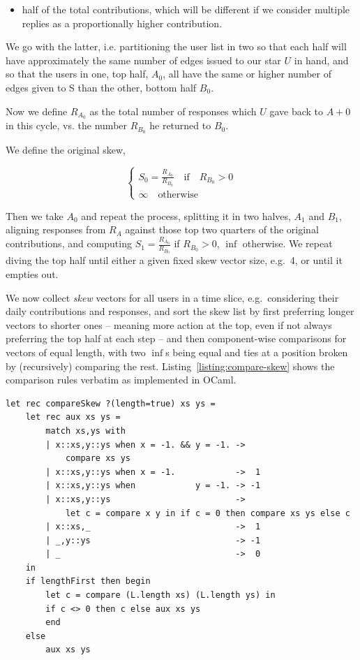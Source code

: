 \documentclass[10pt,oneside]{memoir}
\begin{document}
\begin{Spacing}{2}
\begin{itemize}
\item half of the total contributions, which will be different if we consider multiple replies as a proportionally higher contribution.
\end{itemize}


We go with the latter, i.e. partitioning the user list in two so that each half will have approximately the same number of edges issued to our star $U$ in hand, and so that the users in one, top half, $A_0$, all have the same or higher number of edges given to S than the other, bottom half $B_0$.

Now we define $R_{A_0}$ as the total number of responses  which $U$ gave back to $A+0$ in this cycle, vs. the number $R_{B_0}$ he returned to $B_0$.

We define the original skew,

\[
\left\lbrace
\begin{array}{l}
    S_0 = \frac{R_{A_0}}{R_{B_0}} \quad\mbox{if}\quad R_{B_0} > 0 \\
    \infty \quad\mbox{otherwise} 
\end{array}
\right.
\]

Then we take $A_0$ and repeat the process, splitting it in two halves, $A_1$ and $B_1$, aligning responses from $R_A$ against those top two quarters of the original contributions, and computing $S_1 = \frac{R_{A_0}}{R_{B_0}}$ if $R_{B_0} > 0$, $\inf$ otherwise.
We repeat diving the top half until either a given fixed skew vector size, e.g.\ 4, or until it empties out.


We now collect {\itshape skew} vectors for all users in a time slice, e.g.\ considering their daily contributions and responses, and sort the skew list by first preferring longer vectors to shorter ones -- meaning more action at the top, even if not always preferring the top half at each step -- and then component-wise comparisons for vectors of equal length, with two $\inf$s being equal and ties at a position broken by (recursively) comparing the rest.  Listing~\ref{listing:compare-skew} shows the comparison rules verbatim as implemented in OCaml.



\begin{lstlisting}
let rec compareSkew ?(length=true) xs ys =
    let rec aux xs ys =
        match xs,ys with
        | x::xs,y::ys when x = -1. && y = -1. ->
            compare xs ys
        | x::xs,y::ys when x = -1.            ->  1
        | x::xs,y::ys when            y = -1. -> -1
        | x::xs,y::ys                         -> 
            let c = compare x y in if c = 0 then compare xs ys else c
        | x::xs,_                             ->  1
        | _,y::ys                             -> -1
        | _                                   ->  0
    in
    if lengthFirst then begin
        let c = compare (L.length xs) (L.length ys) in
        if c <> 0 then c else aux xs ys
        end
    else
        aux xs ys


\end{lstlisting}
\end{Spacing}
\end{document}
